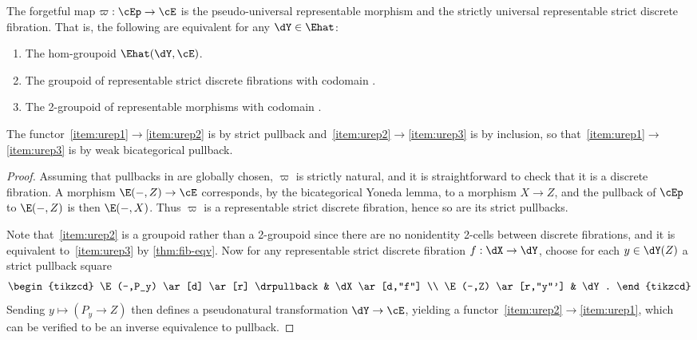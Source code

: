 \begin{prop}\label{thm:univrep}
  The forgetful map $\varpi:\cEp\to\cE$ is the pseudo-universal representable morphism and the strictly universal representable strict discrete fibration.
  That is, the following are equivalent for any $\dY\in\Ehat$:
  \begin{enumerate}
  \item The hom-groupoid $\Ehat(\dY,\cE)$.\label{item:urep1}
  \item The groupoid of representable strict discrete fibrations with codomain \dY.\label{item:urep2}
  \item The 2-groupoid of representable morphisms with codomain \dY.\label{item:urep3}
  \end{enumerate}
  The functor~\ref{item:urep1}$\to$\ref{item:urep2} is by strict pullback and~\ref{item:urep2}$\to$\ref{item:urep3} is by inclusion, so that~\ref{item:urep1}$\to$\ref{item:urep3} is by weak bicategorical pullback.
\end{prop}
\begin{proof}
  Assuming that pullbacks in \E are globally chosen, $\varpi$ is strictly natural, and it is straightforward to check that it is a discrete fibration.
  A morphism $\E(-,Z) \to \cE$ corresponds, by the bicategorical Yoneda lemma, to a morphism $X\to Z$, and the pullback of $\cEp$ to $\E(-,Z)$ is then $\E(-,X)$.
  Thus $\varpi$ is a representable strict discrete fibration, hence so are its strict pullbacks.

  Note that~\ref{item:urep2} is a groupoid rather than a 2-groupoid since there are no nonidentity 2-cells between discrete fibrations, and it is equivalent to~\ref{item:urep3} by \cref{thm:fib-eqv}.
  Now for any representable strict discrete fibration $f:\dX\to\dY$, choose for each $y\in \dY(Z)$ a strict pullback square
  \[
    \begin{tikzcd}
      \E(-,P_y) \ar[d] \ar[r] \drpullback & \dX \ar[d,"f"] \\
      \E(-,Z) \ar[r,"y"'] & \dY.
    \end{tikzcd}
  \]
  Sending $y\mapsto (P_y\to Z)$ then defines a pseudonatural transformation $\dY\to\cE$, yielding a functor~\ref{item:urep2}$\to$\ref{item:urep1}, which can be verified to be an inverse equivalence to pullback.
\end{proof}

